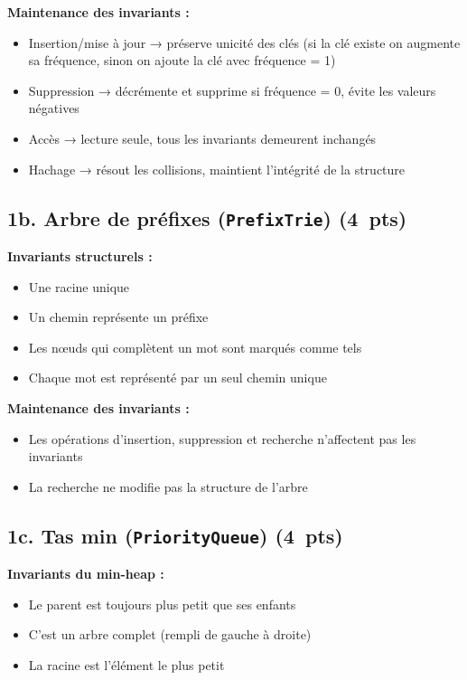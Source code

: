 \documentclass[12pt,a4paper]{article}
\newcommand{\jclass}[1]{\texttt{#1}}
\newcommand{\pts}[1]{\hfill\textbf{\small(#1~pts)}}
\newcommand{\answerspace}[1]{\vspace{#1}}
\begin{document}
\textbf{Maintenance des invariants :}
\begin{itemize}
  \item Insertion/mise à jour → préserve unicité des clés (si la clé existe on augmente sa fréquence, sinon on ajoute la clé avec fréquence = 1)
  \item Suppression → décrémente et supprime si fréquence = 0, évite les valeurs négatives
  \item Accès → lecture seule, tous les invariants demeurent inchangés
  \item Hachage → résout les collisions, maintient l'intégrité de la structure
\end{itemize}

\answerspace{6em}

\subsection*{1b. Arbre de préfixes (\jclass{PrefixTrie}) \pts{4}}

\textbf{Invariants structurels :}
\begin{itemize}
  \item Une racine unique
  \item Un chemin représente un préfixe
  \item Les nœuds qui complètent un mot sont marqués comme tels
  \item Chaque mot est représenté par un seul chemin unique
\end{itemize}

\textbf{Maintenance des invariants :}
\begin{itemize}
  \item Les opérations d'insertion, suppression et recherche n'affectent pas les invariants
  \item La recherche ne modifie pas la structure de l'arbre
\end{itemize}

\answerspace{8em}

\subsection*{1c. Tas min (\jclass{PriorityQueue}) \pts{4}}

\textbf{Invariants du min-heap :}
\begin{itemize}
  \item Le parent est toujours plus petit que ses enfants
  \item C'est un arbre complet (rempli de gauche à droite)
  \item La racine est l'élément le plus petit
\end{itemize}
\end{document}
